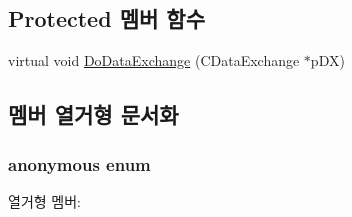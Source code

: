 \subsection*{Protected 멤버 함수}
\begin{DoxyCompactItemize}
\item 
virtual void \hyperlink{class_c_scl_dlg_ac310ef75be8baafc95824aed2cc6ba23}{Do\-Data\-Exchange} (C\-Data\-Exchange $\ast$p\-D\-X)
\end{DoxyCompactItemize}


\subsection{멤버 열거형 문서화}
\hypertarget{class_c_scl_dlg_a1ed7185c27a2ce41c94d772b6b1bd6ec}{\subsubsection[{anonymous enum}]{\setlength{\rightskip}{0pt plus 5cm}anonymous enum}}\label{class_c_scl_dlg_a1ed7185c27a2ce41c94d772b6b1bd6ec}
\begin{Desc}
\item[열거형 멤버\-: ]\par
\begin{description}
\item[{\em 
\hypertarget{class_c_scl_dlg_a1ed7185c27a2ce41c94d772b6b1bd6eca37c13cd75af0df4b69cff990e78b8c5c}{I\-D\-D}\label{class_c_scl_dlg_a1ed7185c27a2ce41c94d772b6b1bd6eca37c13cd75af0df4b69cff990e78b8c5c}
}]\end{description}
\end{Desc}




